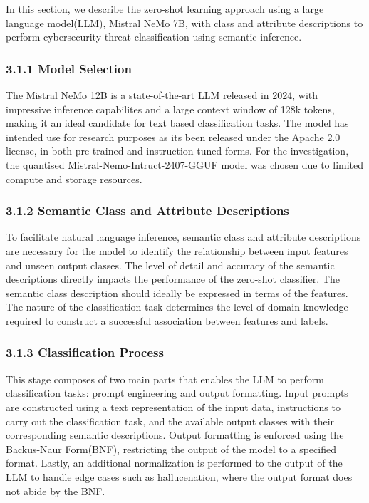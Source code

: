 \documentclass[letterpaper,twocolumn,fleqn]{article}
\begin{document}
In this section, we describe the zero-shot learning approach using 
a large language model(LLM), Mistral NeMo 7B, with class and attribute 
descriptions to perform cybersecurity threat classification using
semantic inference.

\subsubsection{3.1.1 Model Selection}
The Mistral NeMo 12B is a state-of-the-art LLM released in 2024, 
with impressive inference capabilites and a large context window of 
128k tokens, making it an ideal candidate for text based classification tasks.
The model has intended use for research purposes as its been released under the Apache 2.0 license, 
in both pre-trained and instruction-tuned forms. For the investigation, the quantised Mistral-Nemo-Intruct-2407-GGUF model was chosen 
due to limited compute and storage resources.
\subsubsection{3.1.2 Semantic Class and Attribute Descriptions}
To facilitate natural language inference, semantic class and attribute descriptions are necessary for the model to identify the relationship between input features and unseen output classes. The level of detail and accuracy of the semantic descriptions directly impacts the performance of the zero-shot classifier. The semantic class description should ideally be expressed in terms of the features. The nature of the classification task determines the level of domain knowledge required to construct a successful association between features and labels. 

\subsubsection{3.1.3 Classification Process}
This stage composes of two main parts that enables the LLM to perform classification tasks: prompt engineering and output formatting.
Input prompts are constructed using a text representation of the input data, instructions to carry out the classification task, and the available output classes with their corresponding semantic descriptions.
Output formatting is enforced using the Backus-Naur Form(BNF), restricting the output of the model to a specified format. Lastly, an additional normalization is performed to the output of the LLM to handle edge cases such as hallucenation, where the output format does not abide by the BNF. 
\end{document}
